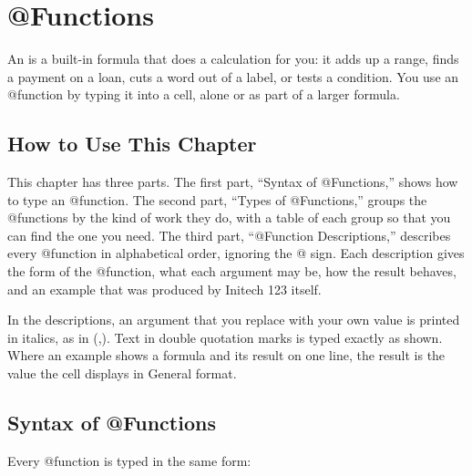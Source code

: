 \chapter{@Functions}

An  is a built-in formula that does a calculation for you:
it adds up a range, finds a payment on a loan, cuts a word out of a label,
or tests a condition. You use an @function by typing it into a cell, alone
or as part of a larger formula.

\section{How to Use This Chapter}
This chapter has three parts. The first part, ``Syntax of @Functions,''
shows how to type an @function. The second part, ``Types of
@Functions,'' groups the @functions by the kind of work they do, with a table of each group so
that you can find the one you need. The third part, ``@Function
Descriptions,'' describes every @function in alphabetical order, ignoring the
@ sign. Each description gives the form of the @function, what each
argument may be, how the result behaves, and an example that was produced by
Initech 123 itself.

In the descriptions, an argument that you replace with your own value is
printed in italics, as in (,). Text in double
quotation marks is typed exactly as shown. Where an example shows a
formula and its result on one line, the result is the value the cell
displays in General format.

\section{Syntax of @Functions}
Every @function is typed in the same form:


